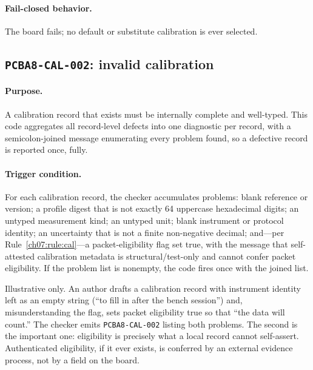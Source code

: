 \paragraph{Fail-closed behavior.} The board fails; no default or substitute calibration is ever selected.

\subsection{\texttt{PCBA8-CAL-002}: invalid calibration}\label{ch07:sub:cal002}

\paragraph{Purpose.} A calibration record that exists must be internally complete and well-typed. This code aggregates all record-level defects into one diagnostic per record, with a semicolon-joined message enumerating every problem found, so a defective record is reported once, fully.

\paragraph{Trigger condition.} For each calibration record, the checker accumulates problems: blank reference or version; a profile digest that is not exactly 64 uppercase hexadecimal digits; an untyped measurement kind; an untyped unit; blank instrument or protocol identity; an uncertainty that is not a finite non-negative decimal; and---per Rule~\ref{ch07:rule:cal}---a packet-eligibility flag set true, with the message that self-attested calibration metadata is structural/test-only and cannot confer packet eligibility. If the problem list is nonempty, the code fires once with the joined list.

\begin{example}\label{ch07:ex:cal002}
Illustrative only. An author drafts a calibration record with instrument identity left as an empty string (``to fill in after the bench session'') and, misunderstanding the flag, sets packet eligibility true so that ``the data will count.'' The checker emits \texttt{PCBA8-CAL-002} listing both problems. The second is the important one: eligibility is precisely what a local record cannot self-assert. Authenticated eligibility, if it ever exists, is conferred by an external evidence process, not by a field on the board.
\end{example}

